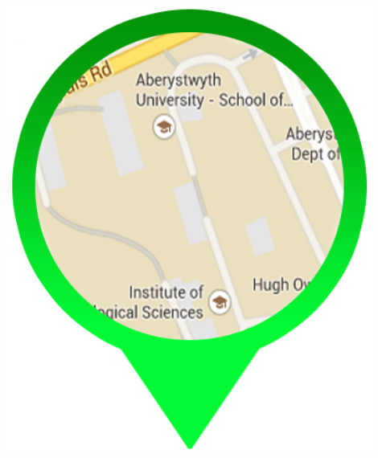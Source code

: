 \documentclass[a0,landscape]{a0poster}
\begin{document}
\begin{minipage}[b]{0.19\linewidth}
\includegraphics[width=12cm]{logo.png} %
\end{minipage}

\setlength{\belowcaptionskip}{-10pt}

\vspace{0.3cm} %

\end{document}
